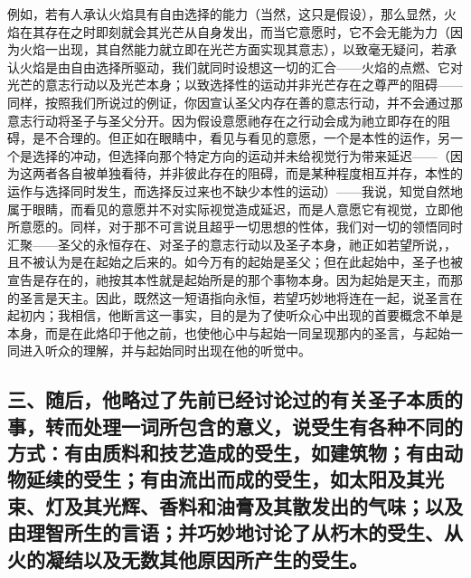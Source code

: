 例如，若有人承认火焰具有自由选择的能力（当然，这只是假设），那么显然，火焰在其存在之时即刻就会其光芒从自身发出，而当它意愿时，它不会无能为力（因为火焰一出现，其自然能力就立即在光芒方面实现其意志），以致毫无疑问，若承认火焰是由自由选择所驱动，我们就同时设想这一切的汇合——火焰的点燃、它对光芒的意志行动以及光芒本身；以致选择性的运动并非光芒存在之尊严的阻碍——同样，按照我们所说过的例证，你因宣认圣父内存在善的意志行动，并不会通过那意志行动将圣子与圣父分开。因为假设意愿祂存在之行动会成为祂立即存在的阻碍，是不合理的。但正如在眼睛中，看见与看见的意愿，一个是本性的运作，另一个是选择的冲动，但选择向那个特定方向的运动并未给视觉行为带来延迟——（因为这两者各自被单独看待，并非彼此存在的阻碍，而是某种程度相互并存，本性的运作与选择同时发生，而选择反过来也不缺少本性的运动）——我说，知觉自然地属于眼睛，而看见的意愿并不对实际视觉造成延迟，而是人意愿它有视觉，立即他所意愿的。同样，对于那不可言说且超乎一切思想的性体，我们对一切的领悟同时汇聚——圣父的永恒存在、对圣子的意志行动以及圣子本身，祂正如若望所说，，且不被认为是在起始之后来的。如今万有的起始是圣父；但在此起始中，圣子也被宣告是存在的，祂按其本性就是起始所是的那个事物本身。因为起始是天主，而那的圣言是天主。因此，既然这一短语指向永恒，若望巧妙地将连在一起，说圣言在起初内；我相信，他断言这一事实，目的是为了使听众心中出现的首要概念不单是本身，而是在此烙印于他之前，也使他心中与起始一同呈现那内的圣言，与起始一同进入听众的理解，并与起始同时出现在他的听觉中。\par


\subsection{三、随后，他略过了先前已经讨论过的有关圣子本质的事，转而处理一词所包含的意义，说受生有各种不同的方式：有由质料和技艺造成的受生，如建筑物；有由动物延续的受生；有由流出而成的受生，如太阳及其光束、灯及其光辉、香料和油膏及其散发出的气味；以及由理智所生的言语；并巧妙地讨论了从朽木的受生、从火的凝结以及无数其他原因所产生的受生。}

